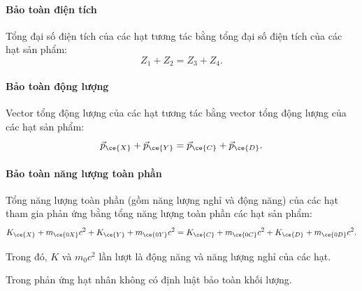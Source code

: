 \begin{tomtat}
	\paragraph{Bảo toàn điện tích}
	\begin{boxdl}
		Tổng đại số điện tích của các hạt tương tác bằng tổng đại số điện tích của các hạt sản phẩm:
		\begin{equation}
			Z_1+Z_2=Z_3+Z_4.
		\end{equation}
	\end{boxdl}
	\paragraph{Bảo toàn động lượng}
\begin{boxdl}
		Vector tổng động lượng của các hạt tương tác bằng vector tổng động lượng của các hạt sản phẩm:
	\begin{equation}
		\vec{p}_{\ce{X}}+\vec{p}_{\ce{Y}}=\vec{p}_{\ce{C}}+\vec{p}_{\ce{D}}.
	\end{equation}
\end{boxdl}
	\paragraph{Bảo toàn năng lượng toàn phần}
	\begin{boxdl}
		Tổng năng lượng toàn phần (gồm năng lượng nghỉ và động năng) của các hạt tham gia phản ứng bằng tổng năng lượng toàn phần các hạt sản phẩm:
		\begin{equation}
			K_{\ce{X}}+m_{\ce{0X}}c^2+K_{\ce{Y}}+m_{\ce{0Y}}c^2=K_{\ce{C}}+m_{\ce{0C}}c^2+K_{\ce{D}}+m_{\ce{0D}}c^2.
		\end{equation}
	\end{boxdl}
	Trong đó, $K$ và $m_0c^2$ lần lượt là động năng và năng lượng nghỉ của các hạt.
\begin{note}
	Trong phản ứng hạt nhân không có định luật bảo toàn khối lượng.
\end{note}
\end{tomtat}
